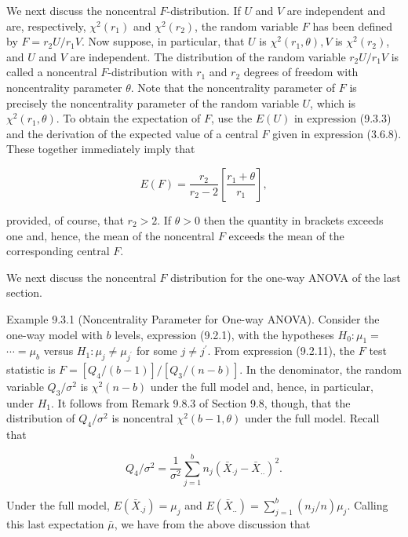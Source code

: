We next discuss the noncentral $F$-distribution. If $U$ and $V$ are independent and are, respectively, $\chi^{2}\left(r_{1}\right)$ and $\chi^{2}\left(r_{2}\right)$, the random variable $F$ has been defined by $F=r_{2} U / r_{1} V$. Now suppose, in particular, that $U$ is $\chi^{2}\left(r_{1}, \theta\right), V$ is $\chi^{2}\left(r_{2}\right)$, and $U$ and $V$ are independent. The distribution of the random variable $r_{2} U / r_{1} V$ is called a noncentral $F$-distribution with $r_{1}$ and $r_{2}$ degrees of freedom with noncentrality parameter $\theta$. Note that the noncentrality parameter of $F$ is precisely the noncentrality parameter of the random variable $U$, which is $\chi^{2}\left(r_{1}, \theta\right)$. To obtain the expectation of $F$, use the $E(U)$ in expression (9.3.3) and the derivation of the expected value of a central $F$ given in expression (3.6.8). These together immediately imply that


\begin{equation*}
E(F)=\frac{r_{2}}{r_{2}-2}\left[\frac{r_{1}+\theta}{r_{1}}\right], \tag{9.3.4}
\end{equation*}


provided, of course, that $r_{2}>2$. If $\theta>0$ then the quantity in brackets exceeds one and, hence, the mean of the noncentral $F$ exceeds the mean of the corresponding central $F$.

We next discuss the noncentral $F$ distribution for the one-way ANOVA of the last section.

Example 9.3.1 (Noncentrality Parameter for One-way ANOVA). Consider the one-way model with $b$ levels, expression (9.2.1), with the hypotheses $H_{0}: \mu_{1}=$ $\cdots=\mu_{b}$ versus $H_{1}: \mu_{j} \neq \mu_{j^{\prime}}$ for some $j \neq j^{\prime}$. From expression (9.2.11), the $F$ test statistic is $F=\left[Q_{4} /(b-1)\right] /\left[Q_{3} /(n-b)\right]$. In the denominator, the random variable $Q_{3} / \sigma^{2}$ is $\chi^{2}(n-b)$ under the full model and, hence, in particular, under $H_{1}$. It follows from Remark 9.8.3 of Section 9.8, though, that the distribution of $Q_{4} / \sigma^{2}$ is noncentral $\chi^{2}(b-1, \theta)$ under the full model. Recall that

$$
Q_{4} / \sigma^{2}=\frac{1}{\sigma^{2}} \sum_{j=1}^{b} n_{j}\left(\bar{X}_{\cdot j}-\bar{X}_{. .}\right)^{2} .
$$

Under the full model, $E\left(\bar{X}_{. j}\right)=\mu_{j}$ and $E\left(\bar{X}_{. .}\right)=\sum_{j=1}^{b}\left(n_{j} / n\right) \mu_{j}$. Calling this last expectation $\bar{\mu}$, we have from the above discussion that


